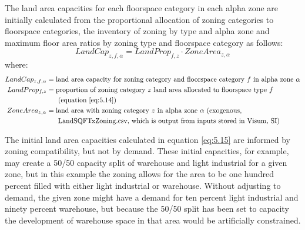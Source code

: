 The land area capacities for each floorspace category in each alpha zone are initially calculated from the proportional allocation of zoning categories to floorspace categories, the inventory of zoning by type and alpha zone and maximum floor area ratios by zoning type and floorspace category as follows:
\begin{equation}\label{eq:5.16}    %
LandCap_{z,f,\alpha} = LandProp_{f,z} \cdot ZoneArea_{z,\alpha}
\end{equation}
\noindent where:
\begin{align*}
LandCap_{z,f,\alpha} &= \text{land area capacity for zoning category and floorspace category $f$ in alpha zone $\alpha$} \\
LandProp_{f,z} &= \text{proportion of zoning category $z$ land area allocated to floorspace type $f$} \\
 &~~~~~\text{(equation \ref{eq:5.14})} \\
ZoneArea_{z,\alpha} &= \text{land area with zoning category $z$ in alpha zone $\alpha$ (exogenous,} \\
 &~~~~~\text{LandSQFTxZoning.csv, which is output from inputs stored in Visum, SI)}
\end{align*}

The initial land area capacities calculated in equation \ref{eq:5.15} are informed by zoning compatibility, but not by demand. These initial capacities, for example, may create a 50/50 capacity split of warehouse and light industrial for a given zone, but in this example the zoning allows for the area to be one hundred percent filled with either light industrial or warehouse. Without adjusting to demand, the given zone might have a demand for ten percent light industrial and ninety percent warehouse, but because the 50/50 split has been set to capacity the development of warehouse space in that area would be artificially constrained.  

